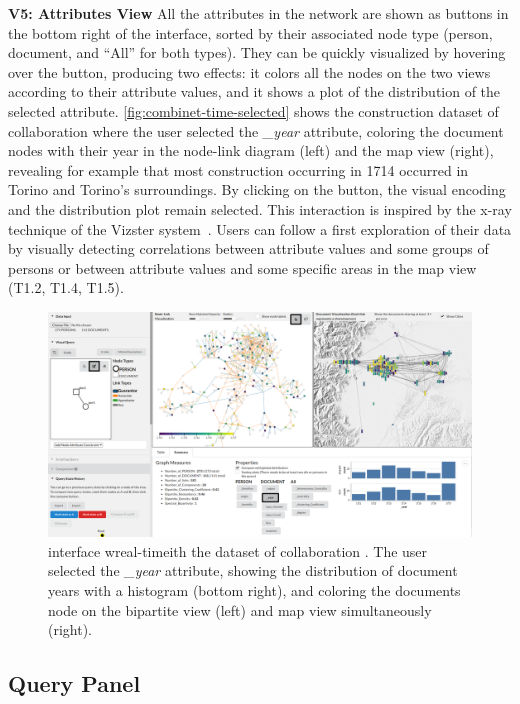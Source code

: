 \noindent\textbf{V5: Attributes View}
All the attributes in the network are shown as buttons in the bottom right of the interface, sorted by their associated node type (person, document, and ``All'' for both types).
They can be quickly visualized by hovering over the button, producing two effects: it colors all the nodes on the two views according to their attribute values, and it shows a plot of the distribution of the selected attribute. \autoref{fig:combinet-time-selected} shows the construction dataset of collaboration \pascal where the user selected the \textit{\_year} attribute, coloring the document nodes with their year in the node-link diagram (left) and the map view (right), revealing for example that most construction occurring in 1714 occurred in Torino and Torino's surroundings.
By clicking on the button, the visual encoding and the distribution plot remain selected.
 This interaction is inspired by the x-ray technique of the Vizster system~\cite{heerVizsterVisualizingOnline2005}.
Users can follow a first exploration of their data by visually detecting correlations between attribute values and some groups of persons or between attribute values and some specific areas in the map view (T1.2, T1.4, T1.5).

\begin{figure}[!ht]
 \centering
    \includegraphics[trim={15.9cm 0 0 0},clip,width=\textwidth]{static/figures/ComBiNet/Piemont_timeSelected.png}
    \caption{\name interface wreal-timeith the dataset of collaboration \pascal. The user selected the \textit{\_year} attribute, showing the distribution of document years with a histogram (bottom right), and coloring the documents node on the bipartite view (left) and map view simultaneously (right).}\label{fig:combinet-time-selected}
\end{figure}

\subsection{Query Panel}

